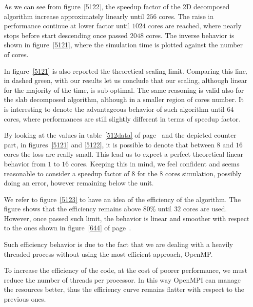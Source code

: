 As we can see from figure~\ref{5122}, the speedup factor of the 2D decomposed algorithm increase approximately linearly until $256$ cores. The raise in performance continue at lower factor until $1024$ cores are reached, where nearly stops before start descending once passed $2048$ cores.
The inverse behavior is shown in figure~\ref{5121}, where the simulation time is plotted against the number of cores.
\par
In figure~\ref{5121} is also reported the theoretical scaling limit. Comparing this line, in dashed green, with our results let us conclude that our scaling, although linear for the majority of the time, is sub-optimal. 
The same reasoning is valid also for the slab decomposed algorithm, although in a smaller region of cores number.
It is interesting to denote the advantageous behavior of such algorithm until $64$ cores, where performances are still slightly different in terms of speedup factor. 
\par
By looking at the values in table~\ref{512data} of page~\pageref{512data} and the depicted counter part, in figures~\ref{5121} and \ref{5122}, it is possible to denote that between $8$ and $16$ cores the loss are really small. This lead us to expect a perfect theoretical linear behavior from $1$ to $16$ cores. Keeping this in mind, we feel confident and seems reasonable to consider a speedup factor of $8$ for the $8$ cores simulation, possibly doing an error, however remaining below the unit. \\
\par
We refer to figure~\ref{5123} to have an idea of the efficiency of the algorithm. The figure shows that the efficiency remains above $80\%$ until $32$ cores are used. However, once passed such limit, the behavior is linear and smoother with respect to the ones shown in figure~\ref{644} of page~\pageref{644}. 
\par
Such efficiency behavior is due to the fact that we are dealing with a heavily threaded process without using the most efficient approach, OpenMP. \\
\par
To increase the efficiency of the code, at the cost of poorer performance, we must reduce the number of threads per processor. In this way OpenMPI can manage the resources better, thus the efficiency curve remains flatter with respect to the previous ones.
